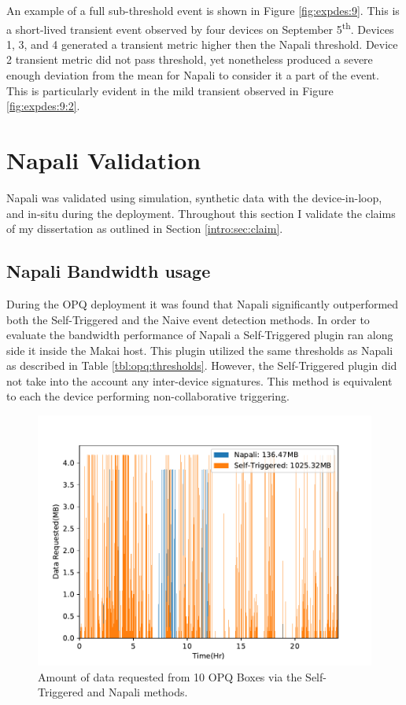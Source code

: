 An example of a full sub-threshold event is shown in Figure \ref{fig:expdes:9}.
This is a short-lived transient event observed by four devices on September 5\textsuperscript{th}.
Devices 1, 3, and 4 generated a transient metric higher then the Napali threshold.
Device 2 transient metric did not pass threshold, yet nonetheless produced a severe enough deviation from the mean for Napali to consider it a part of the event.
This is particularly evident in the mild transient observed in Figure \ref{fig:expdes:9:2}.

\clearpage

\section{Napali Validation}\label{sec:napali-validation}

Napali was validated using simulation, synthetic data with the device-in-loop, and in-situ during the deployment.
Throughout this section I validate the claims of my dissertation as outlined in Section \ref{intro:sec:claim}.

\subsection{Napali Bandwidth usage}\label{subsec:napali-bandwidth-usage}
During the OPQ deployment it was found that Napali significantly outperformed both the Self-Triggered and the Naive event detection methods.
In order to evaluate the bandwidth performance of Napali a Self-Triggered plugin ran along side it inside the Makai host.
This plugin utilized the same thresholds as Napali as described in Table \ref{tbl:opq:thresholds}.
However, the Self-Triggered plugin did not take into the account any inter-device signatures.
This method is equivalent to each the device performing non-collaborative triggering.
\begin{figure}[ht!]
    \centering
    \includegraphics[width=0.8\linewidth]{img/napali_eval/napali_request_bandwidth.pdf}
    \caption{Amount of data requested from 10 OPQ Boxes via the Self-Triggered and Napali methods.}
    \label{expdes:fig:self_triggered_bandwidth}
\end{figure}

